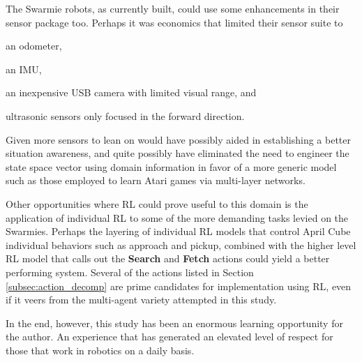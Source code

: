 \documentclass[sigconf,authordraft]{acmart}
\begin{document}
The Swarmie robots, as currently built, could use some enhancements in their sensor package too. Perhaps it was economics that limited their sensor suite to
\begin{enumerate*}[(1)]
  \item an odometer,
  \item an IMU,
  \item an inexpensive USB camera with limited visual range, and
  \item ultrasonic sensors only focused in the forward direction.
\end{enumerate*}
Given more sensors to lean on would have possibly aided in establishing a better situation awareness, and quite possibly have eliminated the need to engineer the state space vector using domain information in favor of a more generic model such as those employed to learn Atari games via multi-layer networks.

Other opportunities where RL could prove useful to this domain is the application of individual RL to some of the more demanding tasks levied on the Swarmies. Perhaps the layering of individual RL models that control April Cube individual behaviors such as approach and pickup, combined with the higher level RL model that calls out the \textbf{Search} and \textbf{Fetch} actions could yield a better performing system. Several of the actions listed in Section \ref{subsec:action_decomp} are prime candidates for implementation using RL, even if it veers from the multi-agent variety attempted in this study.

In the end, however, this study has been an enormous learning opportunity for the author. An experience that has generated an elevated level of respect for those that work in robotics on a daily basis.



\end{document}
